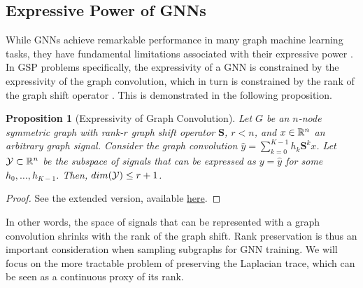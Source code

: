 \documentclass[conference]{IEEEtran}
\newtheorem{proposition}[theorem]{Proposition} %
\theoremstyle{definition}
\begin{document}
\subsection{Expressive Power of GNNs}

While GNNs achieve remarkable performance in many graph machine learning tasks, they have fundamental limitations associated with their expressive power \cite{xu2018how,chen2019equivalence}. In GSP problems specifically, the expressivity of a GNN is constrained by the expressivity of the graph convolution, which in turn is constrained by the rank of the graph shift operator \cite{ruiz2024spectral}. This is demonstrated in the following proposition.

\begin{proposition}[Expressivity of Graph Convolution]
Let $G$ be an $n$-node symmetric graph with rank-$r$ graph shift operator $\mathbf{S}$, $r < n$, and $x \in {\mathbb R}^n$ an arbitrary graph signal. Consider the graph convolution $\hat{y} = \sum_{k=0}^{K-1}h_k\mathbf{S}^kx$. Let ${\mathcal Y} \subset {\mathbb R}^n$ be the subspace of signals that can be expressed as $y=\hat{y}$ for some $h_0, \ldots, h_{K-1}$. Then, $dim({\mathcal Y}) \leq r + 1$.
\end{proposition}
\begin{proof}
   See the extended version, available \href{https://github.com/JamesLi128/Graph-Sampling-for-Scalable-and-Expressive-Graph-Neural-Networks-on-Homophilic-Graphs/blob/master/main.pdf}{here}. 
\end{proof}

In other words, the space of signals that can be represented with a graph convolution shrinks with the rank of the graph shift. Rank preservation is thus an important consideration when sampling subgraphs for GNN training. We will focus on the more tractable problem of preserving the Laplacian trace, which can be seen as a continuous proxy of its rank. 
\end{document}
